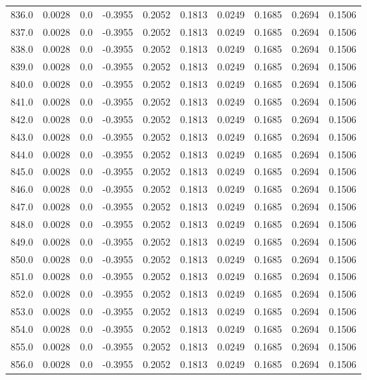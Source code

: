 \begin{longtable}{lrrrrrrrrr}
836.0 & 0.0028 & 0.0 & -0.3955 & 0.2052 & 0.1813 & 0.0249 & 0.1685 & 0.2694 & 0.1506 \\
837.0 & 0.0028 & 0.0 & -0.3955 & 0.2052 & 0.1813 & 0.0249 & 0.1685 & 0.2694 & 0.1506 \\
838.0 & 0.0028 & 0.0 & -0.3955 & 0.2052 & 0.1813 & 0.0249 & 0.1685 & 0.2694 & 0.1506 \\
839.0 & 0.0028 & 0.0 & -0.3955 & 0.2052 & 0.1813 & 0.0249 & 0.1685 & 0.2694 & 0.1506 \\
840.0 & 0.0028 & 0.0 & -0.3955 & 0.2052 & 0.1813 & 0.0249 & 0.1685 & 0.2694 & 0.1506 \\
841.0 & 0.0028 & 0.0 & -0.3955 & 0.2052 & 0.1813 & 0.0249 & 0.1685 & 0.2694 & 0.1506 \\
842.0 & 0.0028 & 0.0 & -0.3955 & 0.2052 & 0.1813 & 0.0249 & 0.1685 & 0.2694 & 0.1506 \\
843.0 & 0.0028 & 0.0 & -0.3955 & 0.2052 & 0.1813 & 0.0249 & 0.1685 & 0.2694 & 0.1506 \\
844.0 & 0.0028 & 0.0 & -0.3955 & 0.2052 & 0.1813 & 0.0249 & 0.1685 & 0.2694 & 0.1506 \\
845.0 & 0.0028 & 0.0 & -0.3955 & 0.2052 & 0.1813 & 0.0249 & 0.1685 & 0.2694 & 0.1506 \\
846.0 & 0.0028 & 0.0 & -0.3955 & 0.2052 & 0.1813 & 0.0249 & 0.1685 & 0.2694 & 0.1506 \\
847.0 & 0.0028 & 0.0 & -0.3955 & 0.2052 & 0.1813 & 0.0249 & 0.1685 & 0.2694 & 0.1506 \\
848.0 & 0.0028 & 0.0 & -0.3955 & 0.2052 & 0.1813 & 0.0249 & 0.1685 & 0.2694 & 0.1506 \\
849.0 & 0.0028 & 0.0 & -0.3955 & 0.2052 & 0.1813 & 0.0249 & 0.1685 & 0.2694 & 0.1506 \\
850.0 & 0.0028 & 0.0 & -0.3955 & 0.2052 & 0.1813 & 0.0249 & 0.1685 & 0.2694 & 0.1506 \\
851.0 & 0.0028 & 0.0 & -0.3955 & 0.2052 & 0.1813 & 0.0249 & 0.1685 & 0.2694 & 0.1506 \\
852.0 & 0.0028 & 0.0 & -0.3955 & 0.2052 & 0.1813 & 0.0249 & 0.1685 & 0.2694 & 0.1506 \\
853.0 & 0.0028 & 0.0 & -0.3955 & 0.2052 & 0.1813 & 0.0249 & 0.1685 & 0.2694 & 0.1506 \\
854.0 & 0.0028 & 0.0 & -0.3955 & 0.2052 & 0.1813 & 0.0249 & 0.1685 & 0.2694 & 0.1506 \\
855.0 & 0.0028 & 0.0 & -0.3955 & 0.2052 & 0.1813 & 0.0249 & 0.1685 & 0.2694 & 0.1506 \\
856.0 & 0.0028 & 0.0 & -0.3955 & 0.2052 & 0.1813 & 0.0249 & 0.1685 & 0.2694 & 0.1506 \\

\end{longtable}
